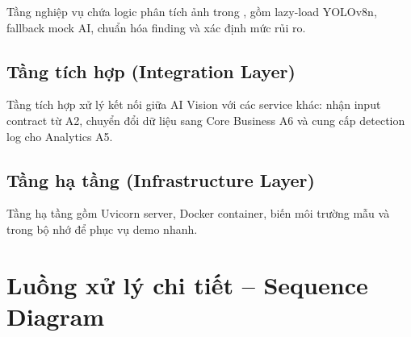 Tầng nghiệp vụ chứa logic phân tích ảnh trong , gồm lazy-load YOLOv8n, fallback mock AI, chuẩn hóa finding và xác định mức rủi ro.

\subsection{Tầng tích hợp (Integration Layer)}

Tầng tích hợp xử lý kết nối giữa AI Vision với các service khác: nhận input contract từ A2, chuyển đổi dữ liệu sang Core Business A6 và cung cấp detection log cho Analytics A5.

\subsection{Tầng hạ tầng (Infrastructure Layer)}

Tầng hạ tầng gồm Uvicorn server, Docker container, biến môi trường mẫu và  trong bộ nhớ để phục vụ demo nhanh.

\section{Luồng xử lý chi tiết -- Sequence Diagram}

